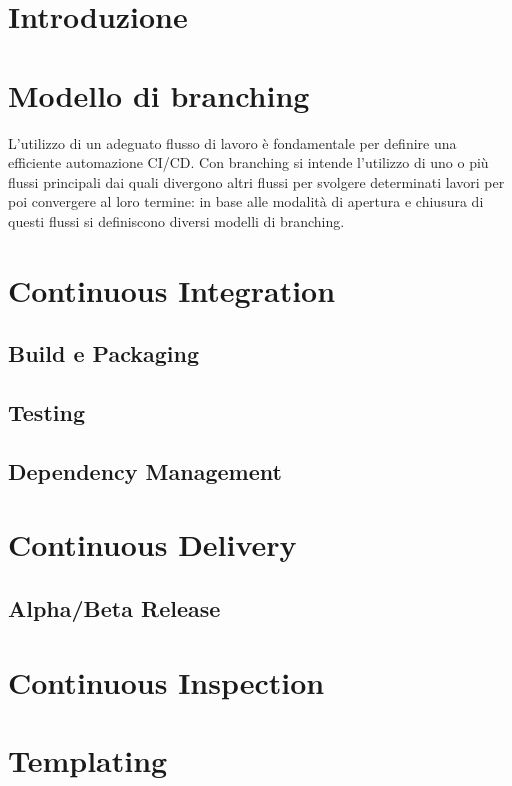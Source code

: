
\section{Introduzione}

\section{Modello di branching}
L’utilizzo di un adeguato flusso di lavoro è fondamentale per definire una efficiente automazione CI/CD. Con branching si intende l’utilizzo di uno o più flussi principali dai quali divergono altri flussi per svolgere determinati lavori per poi convergere al loro termine: in base alle modalità di apertura e chiusura di questi flussi si definiscono diversi modelli di branching.

\section{Continuous Integration}
\subsection{Build e Packaging}

\subsection{Testing}

\subsection{Dependency Management}

\section{Continuous Delivery}

\subsection{Alpha/Beta Release}

\section{Continuous Inspection}

\section{Templating}

